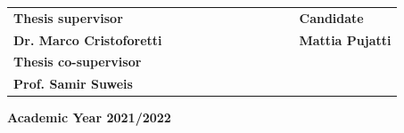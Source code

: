 \documentclass[../main.tex]{subfiles}
\begin{document}
\begin{titlepage}
		\vspace{20mm}
		\begin{spacing}{2}
			\begin{tabular}{ l  c  c c c  cc c c c c  l }
				{\Large{\bf Thesis supervisor}} &&&&&&&&&&& {\Large{\bf Candidate}}\\
				{\Large{\bf Dr. Marco Cristoforetti}} &&&&&&&&&&& {\Large{\bf Mattia Pujatti}}\\
				{\Large{\bf Thesis co-supervisor}}\\
				{\Large{\bf Prof. Samir Suweis}}\\
			\end{tabular}
		\end{spacing}
		\vspace{15 mm}
		
		\begin{center}
			{\Large{\bf Academic Year 2021/2022}}
		\end{center}
	\end{titlepage}
	\clearpage{\pagestyle{empty}\cleardoublepage}
	
	
\end{document}
